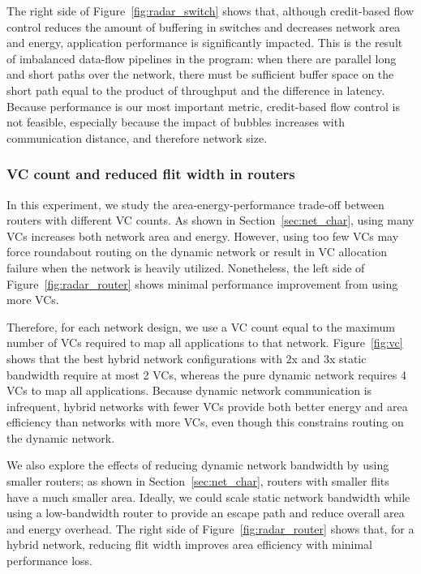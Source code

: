 The right side of Figure~\ref{fig:radar_switch} shows that, although credit-based flow control reduces the amount of buffering in switches and decreases network area and energy, application performance is significantly impacted. 
This is the result of imbalanced data-flow pipelines in the program: when there are parallel long and short paths over the network, there must be sufficient buffer space on the short path equal to the product of throughput and the difference in latency. 
Because performance is our most important metric, credit-based flow control is not feasible, especially because the impact of bubbles increases with communication distance, and therefore network size.

\subsubsection{VC count and reduced flit width in routers}
In this experiment, we study the area-energy-performance trade-off between routers with different VC counts. As shown
in Section~\ref{sec:net_char}, using many VCs increases both network area and energy.
However, using too few VCs may force roundabout routing on the dynamic network or result in VC allocation failure when the network is heavily utilized.
Nonetheless, the left side of Figure~\ref{fig:radar_router} shows minimal performance improvement from using more VCs. 

Therefore, for each network design, we use a VC count equal to the maximum number of VCs required to map all applications to that network. 
Figure~\ref{fig:vc} shows that the best hybrid network configurations with 2x and 3x static bandwidth require at most 2 VCs, whereas the pure dynamic network requires 4 VCs to map all applications.
Because dynamic network communication is infrequent, hybrid networks with fewer VCs provide both better energy and area efficiency than networks with more VCs, even though this constrains routing on the dynamic network.

We also explore the effects of reducing dynamic network bandwidth by using smaller routers;
as shown in Section~\ref{sec:net_char}, routers with smaller flits have a much smaller area.
Ideally, we could scale static network bandwidth while using a low-bandwidth router to provide an escape path and reduce overall area and energy overhead. 
The right side of Figure~\ref{fig:radar_router} shows that, for a hybrid network, reducing flit width improves area efficiency with minimal performance loss. 

